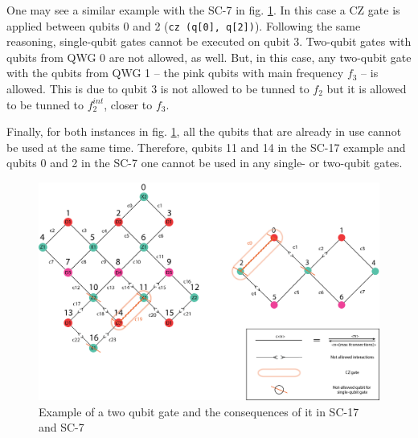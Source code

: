 One may see a similar example with the SC-7 in fig. \ref{fig:two_qubit_gate_ex}. In this case a CZ gate is applied between qubits 0 and 2 (\texttt{cz (q[0], q[2])}). Following the same reasoning, single-qubit gates cannot be executed on qubit 3. Two-qubit gates with qubits from QWG 0 are not allowed, as well. But, in this case, any two-qubit gate with the qubits from QWG 1 -- the pink qubits with main frequency $f_3$ -- is allowed. This is due to qubit 3 is not allowed to be tunned to $f_2$ but it is allowed to be tunned to $f_2^{int}$, closer to $f_3$.

Finally, for both instances in fig. \ref{fig:two_qubit_gate_ex}, all the qubits that are already in use cannot be used at the same time. Therefore, qubits 11 and 14 in the SC-17 example and qubits 0 and 2 in the SC-7 one cannot be used in any single- or two-qubit gates.



\begin{figure}[h!]
\centering
\includegraphics[width=\textwidth]{figures/two_qubit_constraint_sc17_w_cnnct.png}
\caption{\label{fig:two_qubit_gate_ex}
Example of a two qubit gate and the consequences of it in SC-17 and SC-7}
\end{figure}



